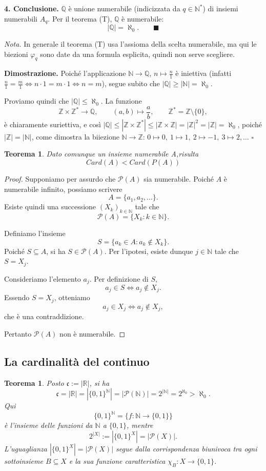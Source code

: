 \documentclass[11pt,a4paper]{article}
\newcommand{\N}{\mathbb{N}}
\newcommand{\Z}{\mathbb{Z}}
\newcommand{\Q}{\mathbb{Q}}
\theoremstyle{definition}
\theoremstyle{plain}
\newtheorem{teorema}[definizione]{Teorema}
\theoremstyle{remark}
\begin{document}
\medskip
\noindent\textbf{4. Conclusione.} $\mathbb{Q}$ \`e unione numerabile
(indicizzata da $q\in\mathbb{N}^*$) di insiemi numerabili $A_q$. Per il
teorema (T), $\mathbb{Q}$ \`e numerabile:
\[
|\mathbb{Q}|=\aleph_0 .
\qquad\blacksquare
\]

\medskip
\noindent\textit{Nota.} In generale il teorema (T) usa l'assioma della scelta
numerabile, ma qui le biezioni $\varphi_q$ sono date da una formula esplicita,
quindi non serve scegliere.


\textbf{Dimostrazione.} Poiché l'applicazione $\N\to\Q$, $n\mapsto\frac n1$ è iniettiva (infatti $\frac n1=\frac m1\iff n\cdot1=m\cdot1\iff n=m$), segue subito che $|\Q|\ge|\N|=\aleph_0$.

Proviamo quindi che $|\Q|\le\aleph_0$. La funzione
\[
\Z\times\Z^*\longrightarrow\Q,\qquad(a,b)\longmapsto\frac ab,\qquad\Z^*=\Z\setminus\{0\},
\]
è chiaramente suriettiva, e così $|\Q|\le|\Z\times\Z^*|\le|\Z\times\Z|=|\Z|^2=|\Z|=\aleph_0$, poiché $|\Z|=|\N|$, come dimostra la biiezione $\N\to\Z$: $0\mapsto0,\ 1\mapsto1,\ 2\mapsto-1,\ 3\mapsto2,\dots$ \hfill$\square$

\begin{teorema}\label{thm:cardistretta}
Dato comunque un insieme numerabile A,risulta 
\[
Card(A)<Card(P(A))
\]
\end{teorema}
\begin{proof}
Supponiamo per assurdo che $\mathcal{P}(A)$ sia numerabile.
Poiché $A$ è numerabile infinito, possiamo scrivere
\[
A=\{a_1,a_2,\ldots\}.
\]
Esiste quindi una successione $(X_k)_{k\in\mathbb{N}}$ tale che
\[
\mathcal{P}(A)=\{X_k:k\in\mathbb{N}\}.
\]

Definiamo l'insieme
\[
S=\{a_k\in A:a_k\notin X_k\}.
\]
Poiché $S\subseteq A$, si ha $S\in\mathcal{P}(A)$.
Per l'ipotesi, esiste dunque $j\in\mathbb{N}$ tale che $S=X_j$.

Consideriamo l'elemento $a_j$. Per definizione di $S$,
\[
a_j\in S \iff a_j\notin X_j.
\]
Essendo $S=X_j$, otteniamo
\[
a_j\in X_j \iff a_j\notin X_j,
\]
che è una contraddizione.

Pertanto $\mathcal{P}(A)$ non è numerabile.
\end{proof}

\subsection{La cardinalità del continuo}

\begin{teorema}\label{thm:ontinuo}
Posto $\mathfrak{c}:=|\mathbb{R}|$, si ha
\[
{
\mathfrak{c}
=|\mathbb{R}|
=|\{0,1\}^{\mathbb{N}}|
=|\mathcal{P}(\mathbb{N})|
=2^{|\mathbb{N}|}
=2^{\aleph_0}
>\aleph_0.
}
\]
Qui
\[
\{0,1\}^{\mathbb{N}}
=
\{f:\mathbb{N}\to\{0,1\}\}
\]
è l'insieme delle funzioni da $\mathbb{N}$ a $\{0,1\}$, mentre
\[
2^{|X|}:=|\{0,1\}^{X}|=|\mathcal{P}(X)|.
\]
L'uguaglianza $|\{0,1\}^{X}|=|\mathcal{P}(X)|$
segue dalla corrispondenza biunivoca tra ogni sottoinsieme
$B\subseteq X$ e la sua funzione caratteristica
$\chi_B:X\to\{0,1\}$.
\end{teorema}
\end{document}
